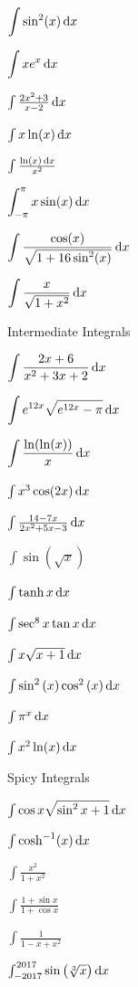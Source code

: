 \documentclass[11pt]{beamer}
\newcommand{\dint}{\displaystyle \int}
\newcommand{\makeslide}[1]{
    \begin{frame}
    \Huge
    \begin{center}
    #1
    \end{center}
    \end{frame}
    \begin{frame}
    \end{frame}
}
\begin{document}
\makeslide{
$\dint{\sin^2(x) \dif x} $
}

\makeslide{
$\dint{x e^x \dif x}$
}

\makeslide{
$\int \frac{2x^2+3}{x-2} \dif x$
}

\makeslide{
$\int x\ln(x) \dif x$
}

\makeslide{
$\int \frac{\ln \left(x\right) \dif x}{x^2}$
}

\makeslide{
$\dint_{-\pi}^{\pi}{x\sin (x) \dif x} $
}

\makeslide{
$\dint{\dfrac{\cos(x)}{\sqrt{1 + 16\sin^2(x)}}} \dif x$
}

\makeslide{
$\dint{\dfrac{x}{\sqrt{1 + x^2}} \dif x}$
}


\makeslide{Intermediate Integrals}

\makeslide{
$\dint{\dfrac{2x + 6}{x^2 + 3x + 2} \dif x}$
}


\makeslide{
$\dint{e^{12x}\sqrt{e^{12x} - \pi} \dif x}$
}

\makeslide{
$\dint{\dfrac{\ln(\ln (x))}{x} \dif x}$
}


\makeslide{
$\int  x^3 \cos(2x)\dif x$
}

\makeslide{
$\int \frac{14-7x}{2x^2+5x-3} \dif x$
}

\makeslide{
$\int \sin(\sqrt{x})$
}

\makeslide{
$ \int \tanh x \dif x $
}

\makeslide{
$\int \sec^8 x \tan x \dif x $
}

\makeslide{
$\int x \sqrt{x + 1} \dif x$
}

\makeslide{
$\int \sin ^2\left(x\right)\cos ^2\left(x\right)\dif x$
}

\makeslide{
$\int \pi^x \dif x $
}

\makeslide{
$\int x^2\ln (x) \dif x $
}

\makeslide{Spicy Integrals}

\makeslide{
$\int \cos x \sqrt{\sin^2 x +1} \dif x$
}

\makeslide{
$\int \cosh^{-1}(x)\dif x$
}

\makeslide{
$\int \frac{x^2}{1+x^2}$
}

\makeslide{
$\int \frac{1+\sin x}{1+\cos x}$
}

\makeslide{
$\int \frac{1}{1-x+x^2}$
}

\makeslide{
$\int_{-2017}^{2017} \sin \left( \sqrt[3]{x} \right) \dif x$
}
\end{document}
